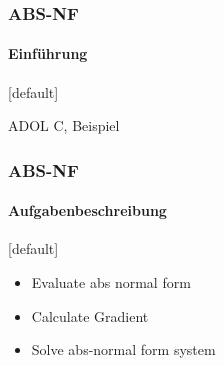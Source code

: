 \begin{frame}
	\frametitle{ABS-NF}
	\framesubtitle{Einführung}
	[default]
	\begin{center}
		ADOL C, Beispiel
	\end{center}
\end{frame}
\begin{frame}
	\frametitle{ABS-NF}
	\framesubtitle{Aufgabenbeschreibung}
	[default]
	\begin{itemize}
		\item Evaluate abs normal form
		\item Calculate Gradient
		\item Solve abs-normal form system
	\end{itemize}
\end{frame}
